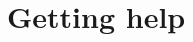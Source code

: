 \documentclass[12pt,twoside]{article}   %
\begin{document}
%
%
%
%

\section{Getting help}
\label{help}
\end{document}
